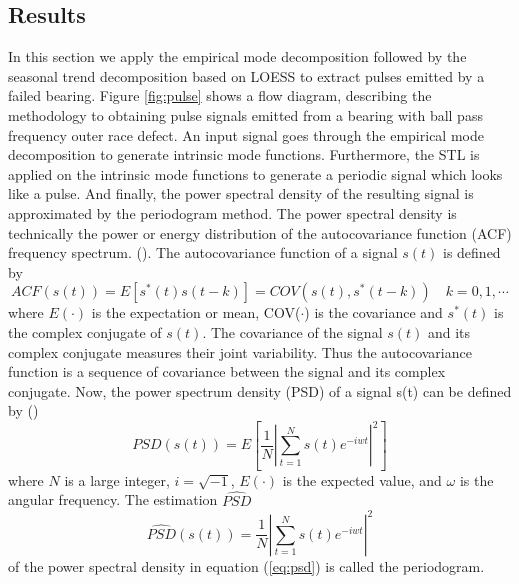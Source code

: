 \documentclass[../Main/thesis.tex]{subfiles}
\begin{document}
\subsection{Results }
In this section we apply the empirical mode decomposition followed by the seasonal trend decomposition based on LOESS to extract pulses emitted by a failed bearing.
Figure \ref{fig:pulse} shows a flow diagram, describing the methodology to obtaining pulse signals emitted from a bearing with ball pass frequency outer race defect. An input signal goes through the empirical mode decomposition to generate intrinsic mode functions. Furthermore, the STL is applied on the intrinsic mode functions to generate a periodic signal which looks like a pulse. And finally, the power spectral density of the resulting signal is approximated by the periodogram method.
\justify
The power spectral density is technically the power or energy distribution of the autocovariance function (ACF) frequency spectrum. (\cite{stoica2004}). The autocovariance function of a signal $s(t)$ is defined by 
\begin{equation}
	ACF(s(t)) = E\left[ s^{*}(t)s(t-k) \right] = COV\left(s(t), s^{*}(t-k)\right)\quad k = 0,1, \cdots
\end{equation}
where $E(\cdot)$ is the expectation or mean, COV($\cdot$) is the covariance and $s^{*}(t)$ is the complex conjugate of $s(t)$. The covariance of the signal $s(t)$ and its complex conjugate measures their joint variability. Thus the autocovariance function is a sequence of covariance between the signal and its complex conjugate. Now, the power spectrum density (PSD) of a signal s(t) can be defined by (\cite{stoica2004})
\begin{equation}\label{eq:psd}
	PSD\left(s(t)\right) = E\left[ \frac{1}{N} \left\vert \sum_{t=1}^{N} s(t)e^{-iwt}\right\vert^{2}   \right]
\end{equation}
where $N$ is a large integer, $i=\sqrt{-1}$, $E(\cdot)$ is the expected value, and $\omega$ is the angular frequency. The estimation $\widehat{PSD}$
\begin{equation}
		\widehat{PSD}\left(s(t)\right) =  \frac{1}{N} \left\vert \sum_{t=1}^{N} s(t)e^{-iwt}\right\vert^{2}
\end{equation}
of the power spectral density in equation (\ref{eq:psd}) is called the periodogram.
\end{document}
